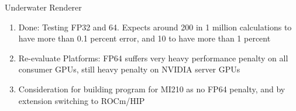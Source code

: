 \begin{frame}{Underwater Renderer}
    \begin{enumerate}
	    \item Done: Testing FP32 and 64. Expects around 200 in 1 million calculations to have more than 0.1 percent error, and 10 to have more than 1 percent
			\item Re-evaluate Platforms: FP64 suffers very heavy performance penalty on all consumer GPUs, still heavy penalty on NVIDIA server GPUs
			\item Consideration for building program for MI210 as no FP64 penalty, and by extension switching to ROCm/HIP
    \end{enumerate}
\end{frame}
